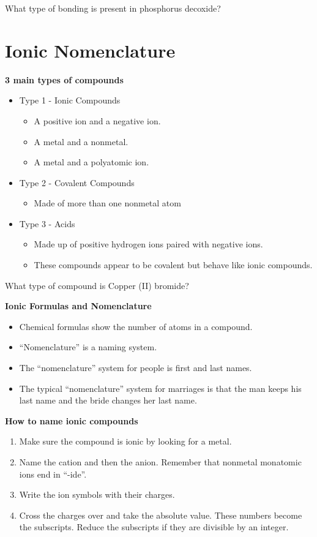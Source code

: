 \documentclass[../hchem.tex]{subfiles}
\begin{document}
\ex What type of bonding is present in phosphorus decoxide? 

\section{Ionic Nomenclature}
\textbf{3 main types of compounds}
\begin{itemize}
    \item Type 1 - Ionic Compounds 
    \begin{itemize}
        \item A positive ion and a negative ion.
        \item A metal and a nonmetal.
        \item A metal and a polyatomic ion.
    \end{itemize}
    \item Type 2 - Covalent Compounds
    \begin{itemize}
        \item Made of more than one nonmetal atom 
    \end{itemize}
    \item Type 3 - Acids 
    \begin{itemize}
        \item Made up of positive hydrogen ions paired with negative ions.
        \item These compounds appear to be covalent but behave like ionic compounds.
    \end{itemize}
\end{itemize}

\ex What type of compound is Copper (II) bromide?

\textbf{Ionic Formulas and Nomenclature}
\begin{itemize}
    \item Chemical formulas show the number of atoms in a compound.
    \item ``Nomenclature'' is a naming system.
    \item The ``nomenclature'' system for people is first and last names.
    \item The typical ``nomenclature'' system for marriages is that the man keeps his last name and the bride changes her last name.
\end{itemize}

\textbf{How to name ionic compounds}
\begin{enumerate}
    \item Make sure the compound is ionic by looking for a metal.
    \item Name the cation and then the anion. Remember that nonmetal monatomic ions end in ``-ide''.
    \item Write the ion symbols with their charges.
    \item Cross the charges over and take the absolute value. These numbers become the subscripts. Reduce the subscripts if they are divisible by an integer.
\end{enumerate}
\end{document}
